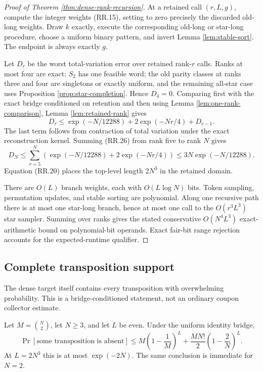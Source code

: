 \begin{proof}[Proof of Theorem \ref{thm:dense-rank-recursion}]
At a retained call $(r,L,g)$, compute the integer weights (RR.15), setting to
zero precisely the discarded old-long weights.  Draw $k$ exactly, execute the
corresponding old-long or star-long procedure, choose a uniform binary
pattern, and invert Lemma \ref{lem:stable-sort}.  The endpoint is always
exactly $g$.

Let $D_r$ be the worst total-variation error over retained rank-$r$ calls.
Ranks at most four are exact: $S_2$ has one feasible word; the old parity
classes at ranks three and four are singletons or exactly uniform, and the
remaining all-star case uses Proposition \ref{prop:star-completion}.  Hence
$D_4=0$.  Comparing first with the exact bridge conditioned on retention and
then using Lemma \ref{lem:one-rank-comparison}, Lemma
\ref{lem:retained-rank} gives
\[
  D_r
  \le
  \exp(-N/12288)+2\exp(-Nr/4)+D_{r-1}.
  \tag{RR.26}
\]
The last term follows from contraction of total variation under the exact
reconstruction kernel.  Summing (RR.26) from rank five to rank $N$ gives
\[
  D_N
  \le
  \sum_{r=5}^N
  \left(\exp(-N/12288)+2\exp(-Nr/4)\right)
  \le 3N\exp(-N/12288).
\]
Equation (RR.20) places the top-level length $2N^3$ in the retained domain.

There are $O(L)$ branch weights, each with $O(L\log N)$ bits.  Token
sampling, permutation updates, and stable sorting are polynomial.  Along one
recursive path there is at most one star-long branch, hence at most one call
to the $O(r^3L^3)$ star sampler.  Summing over ranks gives the stated
conservative $O(N^4L^3)$ exact-arithmetic bound on polynomial-bit operands.
Exact fair-bit range rejection accounts for the expected-runtime qualifier.
\end{proof}

\subsection{Complete transposition support}

The dense target itself contains every transposition with overwhelming
probability.  This is a bridge-conditioned statement, not an ordinary coupon
collector estimate.

\begin{theorem}
\label{thm:dense-complete-support}
Let $M=\binom N2$, let $N\ge3$, and let $L$ be even.  Under the uniform
identity bridge,
\[
  \Pr[\text{some transposition is absent}]
  \le
  M\left(1-\frac1M\right)^L
  +
  \frac{MN!}{2}\left(1-\frac2N\right)^L.
  \tag{RR.27}
\]
At $L=2N^3$ this is at most $\exp(-2N)$.  The same conclusion is immediate
for $N=2$.
\end{theorem}

